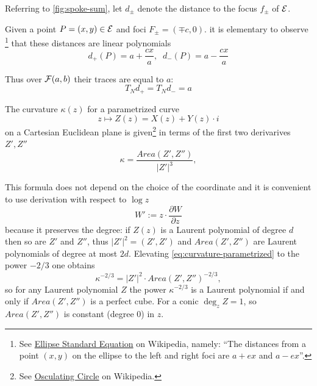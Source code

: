 Referring to \cref{fig:spoke-sum}, let $d_\pm$ denote the distance to the focus $f_\pm$ of $\mathcal{E}$.

Given a point $P=(x,y)\in\mathcal{E}$ and foci $F_\pm = (\mp c,0)$.
it is elementary to observe
\footnote{See \href{https://en.wikipedia.org/wiki/Ellipse\#Standard_equation}{Ellipse Standard Equation} on Wikipedia, namely: ``The distances from a point $(x,y)$ on the ellipse to the left and right foci are $a+ex$ and $a-ex$''.}
that these distances are linear polynomials
\begin{equation}
\label{eq:foci}
 d_+(P) = a + \frac{cx}{a}, \;\; d_-(P) = a - \frac{cx}{a}
\end{equation}

Thus over $\mathcal{F}(a,b)$ their traces are equal to $a$:
\begin{equation}
\label{:dist-focus}
T_N d_+ = T_N d_- = a
\end{equation} 

The curvature $κ(z)$ for a parametrized curve
\begin{equation*}
z\mapsto Z(z) = X(z) + Y(z)\cdot i
\end{equation*}
on a Cartesian Euclidean plane is given\footnote{See \href{https://en.wikipedia.org/wiki/Osculating_circle\#Mathematical_description}{Osculating Circle} on Wikipedia.}
in terms of the first two derivarives $Z',Z''$ 
\begin{equation}
\label{eq:curvature-parametrized}
κ = \frac{Area(Z',Z'')}{|Z'|^3},
\end{equation}

This formula does not depend on the choice of the coordinate
and it is convenient to use derivation with respect to $\log z$
\begin{equation}
W' := z\cdot \frac{\partial W}{\partial z}
\end{equation}
because it preserves the degree: if $Z(z)$ is a Laurent polynomial of degree $d$ then so are $Z'$ and $Z''$,
thus $|Z'|^2 = (Z',Z')$  and $Area(Z',Z'')$ are Laurent polynomials of degree at most $2d$.
Elevating \eqref{eq:curvature-parametrized} to the power $-2/3$ one obtains
\begin{equation}
\label{eq:curvature23-parametrized}
κ^{-2/3} = |Z'|^2 \cdot {Area(Z',Z'')}^{-2/3},
\end{equation}
so for any Laurent polynomial $Z$ the power $κ^{-2/3}$ is a Laurent polynomial
if and only if $Area(Z',Z'')$ is a perfect cube.
For a conic $\deg_z Z = 1$, so $Area(Z',Z'')$ is constant (degree $0$) in $z$.

